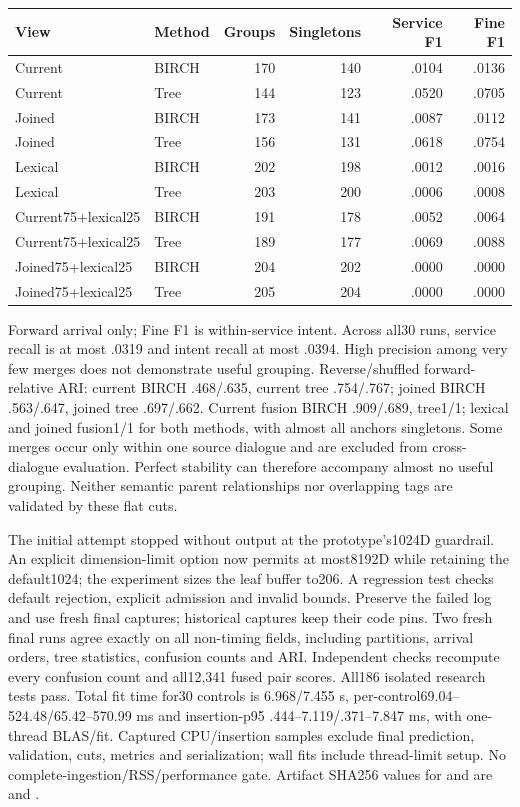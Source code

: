 \documentclass[11pt]{article}
\begin{document}
\begin{center}
\small
\begin{tabular}{llrrrr}
\toprule
View & Method & Groups & Singletons & Service F1 & Fine F1 \\
\midrule
Current & BIRCH & 170 & 140 & .0104 & .0136 \\
Current & Tree & 144 & 123 & .0520 & .0705 \\
Joined & BIRCH & 173 & 141 & .0087 & .0112 \\
Joined & Tree & 156 & 131 & .0618 & .0754 \\
Lexical & BIRCH & 202 & 198 & .0012 & .0016 \\
Lexical & Tree & 203 & 200 & .0006 & .0008 \\
Current75+lexical25 & BIRCH & 191 & 178 & .0052 & .0064 \\
Current75+lexical25 & Tree & 189 & 177 & .0069 & .0088 \\
Joined75+lexical25 & BIRCH & 204 & 202 & .0000 & .0000 \\
Joined75+lexical25 & Tree & 205 & 204 & .0000 & .0000 \\
\bottomrule
\end{tabular}
\end{center}
Forward arrival only; Fine F1 is within-service intent. Across all30 runs,
service recall is at most .0319 and intent recall at most .0394. High precision
among very few merges does not demonstrate useful grouping. Reverse/shuffled
forward-relative ARI: current BIRCH .468/.635, current tree .754/.767;
joined BIRCH .563/.647, joined tree .697/.662. Current fusion BIRCH .909/.689,
tree1/1; lexical and joined fusion1/1 for both methods, with almost all anchors
singletons. Some merges occur only within one source dialogue and are excluded
from cross-dialogue evaluation. Perfect stability can therefore accompany almost
no useful grouping. Neither semantic parent relationships nor overlapping tags
are validated by these flat cuts.

The initial attempt stopped without output at the prototype's1024D guardrail.
An explicit dimension-limit option now permits at most8192D while retaining
the default1024; the experiment sizes the leaf buffer to206. A regression test
checks default rejection, explicit admission and invalid bounds. Preserve the
failed log and use fresh final captures; historical captures keep their code
pins. Two fresh final runs agree exactly on all non-timing fields, including
partitions, arrival orders, tree statistics, confusion counts and ARI. Independent
checks recompute every confusion count and all12,341 fused pair scores.
All186 isolated research tests pass. Total fit time for30 controls is
6.968/7.455 s, per-control69.04--524.48/65.42--570.99 ms and insertion-p95
.444--7.119/.371--7.847 ms, with one-thread BLAS/fit. Captured CPU/insertion
samples exclude final prediction, validation, cuts, metrics and serialization;
wall fits include thread-limit setup. No complete-ingestion/RSS/performance gate.
Artifact SHA256 values for  and
 are
and .
\end{document}
